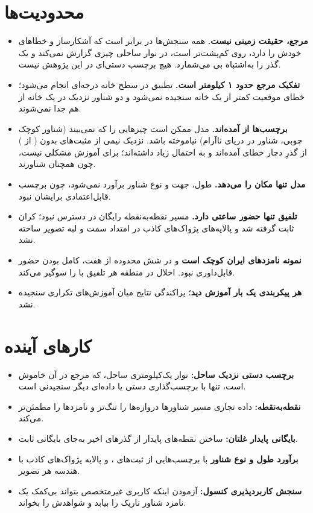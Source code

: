 \section{محدودیت‌ها}
\begin{itemize}
\item \textbf{مرجع، حقیقت زمینی نیست.} همه سنجش‌ها در برابر  است که آشکارساز و خطاهای
خودش را دارد، روی  کم‌پشت‌تر است، در نوار ساحلی چیزی گزارش نمی‌کند و یک
گذر را به‌اشتباه بی‌ می‌شمارد. هیچ برچسب دستی‌ای در این پژوهش نیست.
\item \textbf{تفکیک مرجع حدود ۱ کیلومتر است.} تطبیق در سطح خانه  درجه‌ای انجام
می‌شود؛ خطای موقعیت کمتر از یک خانه سنجیده نمی‌شود و دو شناور نزدیک در یک خانه از هم جدا
نمی‌شوند.
\item \textbf{برچسب‌ها از  آمده‌اند.} مدل ممکن است چیزهایی را که  نمی‌بیند (شناور
کوچک چوبی، شناور در دریای ناآرام) نیاموخته باشد. نزدیک نیمی از مثبت‌های بدون 
( از \dataTrainDark) از گذرِ دچار خطای  آمده‌اند و به احتمال زیاد 
داشته‌اند؛ برای آموزش مشکلی نیست، چون همچنان شناورند.
\item \textbf{مدل تنها مکان را می‌دهد.} طول، جهت و نوع شناور برآورد نمی‌شود، چون برچسب
قابل‌اعتمادی برایشان نبود.
\item \textbf{تلفیق تنها حضور ساعتی دارد.} مسیر نقطه‌به‌نقطه  رایگان در دسترس نبود؛ کران
 ثابت گرفته شد و پالایه‌های پژواک‌های کاذب در امتداد سمت و لبه تصویر ساخته نشد.
\item \textbf{نمونه نامزدهای ایران کوچک است} و در شش محدوده از هفت، کامل بودن حضور 
قابل‌داوری نبود. اخلال  در منطقه هر تلفیق با  را سوگیر می‌کند.
\item \textbf{هر پیکربندی یک بار آموزش دید}؛ پراکندگی نتایج میان آموزش‌های تکراری سنجیده نشد.
\end{itemize}

\section{کارهای آینده}
\begin{itemize}
\item \textbf{برچسب دستی نزدیک ساحل:} نوار یک‌کیلومتری ساحل، که مرجع در آن خاموش است، تنها با
برچسب‌گذاری دستی یا داده‌ای دیگر سنجیدنی است.
\item \textbf{ نقطه‌به‌نقطه:} داده تجاری مسیر شناورها دروازه‌ها را تنگ‌تر و نامزدها را
مطمئن‌تر می‌کند.
\item \textbf{بایگانی پایدار غلتان:} ساختن نقطه‌های پایدار از گذرهای اخیر به‌جای بایگانی ثابت.
\item \textbf{برآورد طول و نوع شناور} با برچسب‌هایی از ثبت‌های ، و پالایه پژواک‌های کاذب
با هندسه هر تصویر.
\item \textbf{سنجش کاربردپذیری کنسول:} آزمودن اینکه کاربری غیرمتخصص بتواند بی‌کمک یک نامزد
شناور تاریک را بیابد و شواهدش را بخواند.
\end{itemize}

